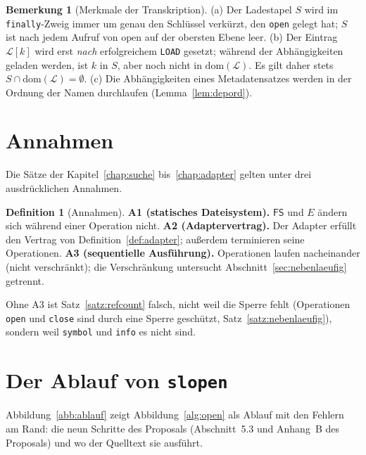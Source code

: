 \documentclass[a4paper,12pt,twoside]{report}
\DeclareRobustCommand{\_}{\ifmmode\mbox{\textunderscore}\else\textunderscore\allowbreak{}\fi}
\theoremstyle{definition}
\newtheorem{definition}{Definition}[chapter]
\newtheorem{bemerkung}{Bemerkung}[chapter]
\newcommand{\FS}{\mathsf{FS}}
\begin{document}
\begin{bemerkung}[Merkmale der Transkription]
	\label{bem:transkription}
	(a) Der Ladestapel $S$ wird im \texttt{finally}-Zweig immer um genau den Schlüssel verkürzt, den \texttt{open} gelegt hat; $S$ ist nach jedem Aufruf von $\mathrm{open}$ auf der obersten Ebene leer. (b) Der Eintrag $\mathcal L[k]$ wird erst \emph{nach} erfolgreichem \texttt{LOAD} gesetzt; während der Abhängigkeiten geladen werden, ist $k$ in $S$, aber noch nicht in $\mathrm{dom}(\mathcal L)$. Es gilt daher stets $S\cap\mathrm{dom}(\mathcal L)=\emptyset$. (c) Die Abhängigkeiten eines Metadatensatzes werden in der Ordnung der Namen durchlaufen (Lemma~\ref{lem:depord}).
\end{bemerkung}

\section{Annahmen}

Die Sätze der Kapitel~\ref{chap:suche} bis~\ref{chap:adapter} gelten unter drei ausdrücklichen Annahmen.

\begin{definition}[Annahmen]
	\textbf{A1 (statisches Dateisystem).} $\FS$ und $E$ ändern sich während einer Operation nicht. \textbf{A2 (Adaptervertrag).} Der Adapter erfüllt den Vertrag von Definition~\ref{def:adapter}; außerdem terminieren seine Operationen. \textbf{A3 (sequentielle Ausführung).} Operationen laufen nacheinander (nicht verschränkt); die Verschränkung untersucht Abschnitt~\ref{sec:nebenlaeufig} getrennt.
\end{definition}

Ohne A3 ist Satz~\ref{satz:refcount} falsch, nicht weil die Sperre fehlt (Operationen \texttt{open} und \texttt{close} sind durch eine Sperre geschützt, Satz~\ref{satz:nebenlaeufig}), sondern weil \texttt{symbol} und \texttt{info} es nicht sind.

\section{Der Ablauf von \texttt{sl\_open}}

Abbildung~\ref{abb:ablauf} zeigt Abbildung~\ref{alg:open} als Ablauf mit den Fehlern am Rand: die neun Schritte des Proposals (Abschnitt~5.3 und Anhang~B des Proposals) und wo der Quelltext sie ausführt.
\end{document}
